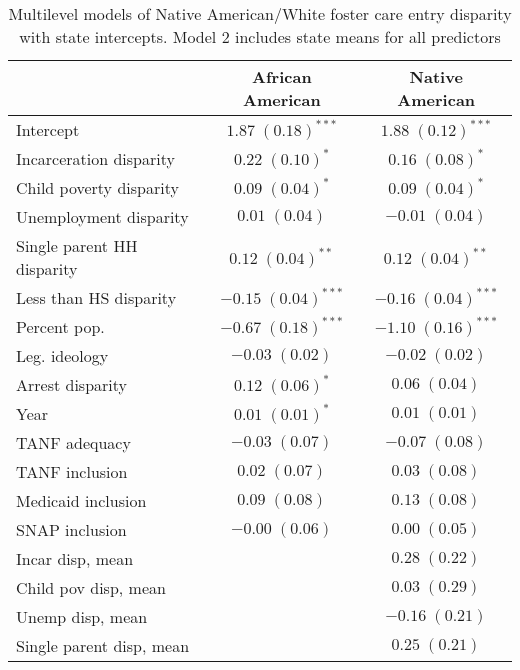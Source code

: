 
\begin{table}
\caption{Multilevel models of Native American/White foster care entry disparity with state intercepts. Model 2 includes state means for all predictors }
\begin{center}
\begin{tabular}{l c c }
\hline
 & African American & Native American \\
\hline
Intercept                  & $1.87 \; (0.18)^{***}$  & $1.88 \; (0.12)^{***}$  \\
Incarceration disparity    & $0.22 \; (0.10)^{*}$    & $0.16 \; (0.08)^{*}$    \\
Child poverty disparity    & $0.09 \; (0.04)^{*}$    & $0.09 \; (0.04)^{*}$    \\
Unemployment disparity     & $0.01 \; (0.04)$        & $-0.01 \; (0.04)$       \\
Single parent HH disparity & $0.12 \; (0.04)^{**}$   & $0.12 \; (0.04)^{**}$   \\
Less than HS disparity     & $-0.15 \; (0.04)^{***}$ & $-0.16 \; (0.04)^{***}$ \\
Percent pop.               & $-0.67 \; (0.18)^{***}$ & $-1.10 \; (0.16)^{***}$ \\
Leg. ideology              & $-0.03 \; (0.02)$       & $-0.02 \; (0.02)$       \\
Arrest disparity           & $0.12 \; (0.06)^{*}$    & $0.06 \; (0.04)$        \\
Year                       & $0.01 \; (0.01)^{*}$    & $0.01 \; (0.01)$        \\
TANF adequacy              & $-0.03 \; (0.07)$       & $-0.07 \; (0.08)$       \\
TANF inclusion             & $0.02 \; (0.07)$        & $0.03 \; (0.08)$        \\
Medicaid inclusion         & $0.09 \; (0.08)$        & $0.13 \; (0.08)$        \\
SNAP inclusion             & $-0.00 \; (0.06)$       & $0.00 \; (0.05)$        \\
Incar disp, mean           &                         & $0.28 \; (0.22)$        \\
Child pov disp, mean       &                         & $0.03 \; (0.29)$        \\
Unemp disp, mean           &                         & $-0.16 \; (0.21)$       \\
Single parent disp, mean   &                         & $0.25 \; (0.21)$        \\

\end{tabular}
\end{center}
\end{table}
